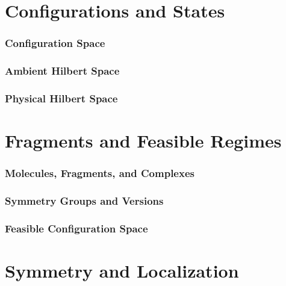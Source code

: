 \documentclass[12pt]{article}
\begin{document}
\part{Configurations and States}
\section{Configuration Space}
\clearpage
\section{Ambient Hilbert Space}
\clearpage
\section{Physical Hilbert Space}
\clearpage
\part{Fragments and Feasible Regimes}
\section{Molecules, Fragments, and Complexes}
\clearpage
\section{Symmetry Groups and Versions}
\clearpage
\section{Feasible Configuration Space}
\clearpage
\part{Symmetry and Localization}
\end{document}
